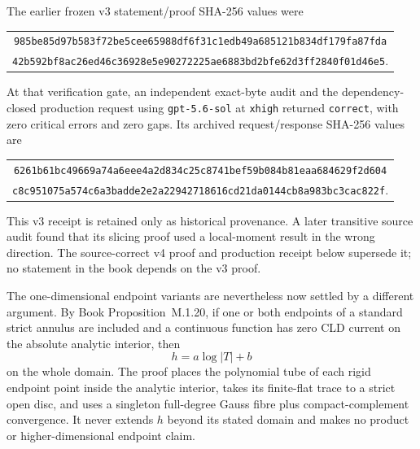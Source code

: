\documentclass[11pt,a4paper]{article}
\theoremstyle{definition}
\theoremstyle{remark}
\begin{document}
The earlier frozen v3 statement/proof SHA-256 values were
\begin{center}
\small
\begin{tabular}{@{}c@{}}
\nolinkurl{985be85d97b583f72be5cee65988df6f31c1edb49a685121b834df179fa87fda}\\
\nolinkurl{42b592bf8ac26ed46c36928e5e90272225ae6883bd2bfe62d3ff2840f01d46e5}.
\end{tabular}
\end{center}
At that verification gate, an independent exact-byte audit and the
dependency-closed production request using \texttt{gpt-5.6-sol} at
\texttt{xhigh} returned \texttt{correct}, with zero critical errors and zero
gaps.  Its archived request/response SHA-256 values are
\begin{center}
\small
\begin{tabular}{@{}c@{}}
\nolinkurl{6261b61bc49669a74a6eee4a2d834c25c8741bef59b084b81eaa684629f2d604}\\
\nolinkurl{c8c951075a574c6a3badde2e2a22942718616cd21da0144cb8a983bc3cac822f}.
\end{tabular}
\end{center}
This v3 receipt is retained only as historical provenance.  A later
transitive source audit found that its slicing proof used a local-moment
result in the wrong direction.  The source-correct v4 proof and production
receipt below supersede it; no statement in the book depends on the v3
proof.

The one-dimensional endpoint variants are nevertheless now settled by a
different argument.  By
Book Proposition~M.1.20, if one or both endpoints
of a standard strict annulus are included and a continuous function has
zero CLD current on the absolute analytic interior, then
\[
                              h=a\log|T|+b
\]
on the whole domain.  The proof places the polynomial tube of each rigid
endpoint point inside the analytic interior, takes its finite-flat trace to
a strict open disc, and uses a singleton full-degree Gauss fibre plus
compact-complement convergence.  It never extends \(h\) beyond its stated
domain and makes no product or higher-dimensional endpoint claim.
\end{document}
